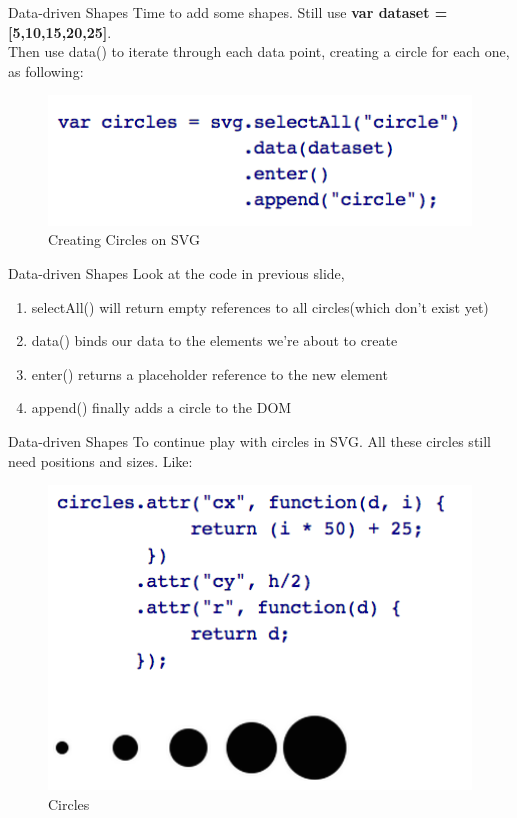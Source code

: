 \documentclass{beamer}
\begin{document}
\begin{frame} {Data-driven Shapes}
Time to add some shapes. Still use \textbf{var dataset = [5,10,15,20,25]}.\\
Then use data() to iterate through each data point, creating a circle for each one, as following:
\begin{figure}
\includegraphics[width=1.0\textwidth]{./images/svg_circles.png}
\caption{\label{fig:svgcircles} Creating Circles on SVG}
\end{figure}
\end{frame}

\begin{frame} {Data-driven Shapes}
Look at the code in previous slide, 
\begin{enumerate}
	\item selectAll() will return empty references to all circles(which don't exist yet)
	\item data() binds our data to the elements we're about to create
	\item enter() returns a placeholder reference to the new element
	\item  append() finally adds a circle to the DOM
\end{enumerate}
\end{frame}

\begin{frame}{Data-driven Shapes}
To continue play with circles in SVG. All these circles still need positions and sizes. Like:
\begin{figure}
\includegraphics[width=1.0\textwidth]{./images/circles.png}
\caption{\label{fig:circles} Circles}
\end{figure}
\end{frame}
\end{document}
